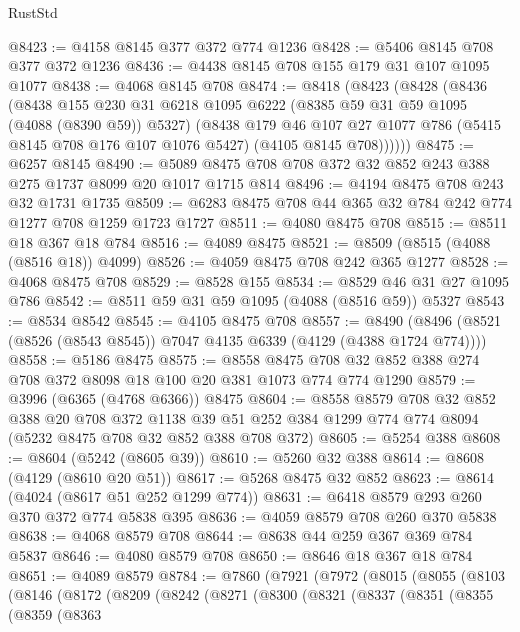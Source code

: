 \begin{lexlean}{RustStd}
\begin{coremodule}
{\begin{coremodule}
{{{{{{{{{{{{{{@8423 := @4158 @8145 @377 @372 @774 @1236
@8428 := @5406 @8145 @708 @377 @372 @1236
@8436 := @4438 @8145 @708 @155 @179 @31 @107 @1095 @1077
@8438 := @4068 @8145 @708
@8474 := @8418
    (@8423
      (@8428
        (@8436
          (@8438
            @155
            @230
            @31
            @6218
            @1095
            @6222
            (@8385 @59 @31 @59 @1095 (@4088 (@8390 @59)) @5327)
            (@8438
              @179
              @46
              @107
              @27
              @1077
              @786
              (@5415 @8145 @708 @176 @107 @1076 @5427)
              (@4105 @8145 @708))))))
@8475 := @6257 @8145
@8490 := @5089 @8475 @708 @708 @372 @32 @852 @243 @388 @275 @1737 @8099 @20 @1017 @1715 @814
@8496 := @4194 @8475 @708 @243 @32 @1731 @1735
@8509 := @6283 @8475 @708 @44 @365 @32 @784 @242 @774 @1277 @708 @1259 @1723 @1727
@8511 := @4080 @8475 @708
@8515 := @8511 @18 @367 @18 @784
@8516 := @4089 @8475
@8521 := @8509 (@8515 (@4088 (@8516 @18)) @4099)
@8526 := @4059 @8475 @708 @242 @365 @1277
@8528 := @4068 @8475 @708
@8529 := @8528 @155
@8534 := @8529 @46 @31 @27 @1095 @786
@8542 := @8511 @59 @31 @59 @1095 (@4088 (@8516 @59)) @5327
@8543 := @8534 @8542
@8545 := @4105 @8475 @708
@8557 := @8490 (@8496 (@8521 (@8526 (@8543 @8545)) @7047 @4135 @6339 (@4129 (@4388 @1724 @774))))
@8558 := @5186 @8475
@8575 := @8558 @8475 @708 @32 @852 @388 @274 @708 @372 @8098 @18 @100 @20 @381 @1073 @774 @774 @1290
@8579 := @3996 (@6365 (@4768 @6366)) @8475
@8604 := @8558
    @8579
    @708
    @32
    @852
    @388
    @20
    @708
    @372
    @1138
    @39
    @51
    @252
    @384
    @1299
    @774
    @774
    @8094
    (@5232 @8475 @708 @32 @852 @388 @708 @372)
@8605 := @5254 @388
@8608 := @8604 (@5242 (@8605 @39))
@8610 := @5260 @32 @388
@8614 := @8608 (@4129 (@8610 @20 @51))
@8617 := @5268 @8475 @32 @852
@8623 := @8614 (@4024 (@8617 @51 @252 @1299 @774))
@8631 := @6418 @8579 @293 @260 @370 @372 @774 @5838 @395
@8636 := @4059 @8579 @708 @260 @370 @5838
@8638 := @4068 @8579 @708
@8644 := @8638 @44 @259 @367 @369 @784 @5837
@8646 := @4080 @8579 @708
@8650 := @8646 @18 @367 @18 @784
@8651 := @4089 @8579
@8784 := @7860
    (@7921
      (@7972
        (@8015
          (@8055
            (@8103
              (@8146
                (@8172
                  (@8209
                    (@8242
                      (@8271
                        (@8300
                          (@8321
                            (@8337
                              (@8351
                                (@8355
                                  (@8359
                                    (@8363
}}}}}}}}}}}}}}
\end{coremodule}}
\end{coremodule}
\end{lexlean}

